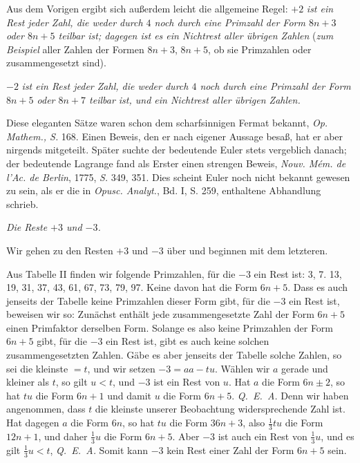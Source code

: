 Aus dem Vorigen ergibt sich außerdem leicht die allgemeine Regel: $+2$ \emph{ist ein Rest jeder Zahl, die weder durch $4$ noch durch eine Primzahl der Form $8n+3$ oder $8n+5$ teilbar ist; dagegen ist es ein Nichtrest aller übrigen Zahlen} (\emph{zum Beispiel} aller Zahlen der Formen $8n+3$, $8n+5$, ob sie Primzahlen oder zusammengesetzt sind).

$-2$ \emph{ist ein Rest jeder Zahl, die weder durch $4$ noch durch eine Primzahl der Form $8n+5$ oder $8n+7$ teilbar ist, und ein Nichtrest aller übrigen Zahlen.}

Diese eleganten Sätze waren schon dem scharfsinnigen Fermat bekannt, \emph{Op. Mathem., S.} 168. Einen Beweis, den er nach eigener Aussage besaß, hat er aber nirgends mitgeteilt. Später suchte der bedeutende Euler stets vergeblich danach; der bedeutende Lagrange fand als Erster einen strengen Beweis, \emph{Nouv. M\'em. de l'Ac. de Berlin}, 1775, \emph{S.} 349, 351. Dies scheint Euler noch nicht bekannt gewesen zu sein, als er die in \emph{Opusc. Analyt.}, Bd. I, S. 259, enthaltene Abhandlung schrieb.

\begin{center}\emph{Die Reste $+3$ und $-3$.}\end{center}

Wir gehen zu den Resten $+3$ und $-3$ über und beginnen mit dem letzteren.

Aus Tabelle II finden wir folgende Primzahlen, für die $-3$ ein Rest ist: 3, 7. 13, 19, 31, 37, 43, 61, 67, 73, 79, 97. Keine davon hat die Form $6n+5$. Dass es auch jenseits der Tabelle keine Primzahlen dieser Form gibt, für die $-3$ ein Rest ist, beweisen wir so: Zunächst enthält jede zusammengesetzte Zahl der Form $6n+5$ einen Primfaktor derselben Form. Solange es also keine Primzahlen der Form $6n+5$ gibt, für die $-3$ ein Rest ist, gibt es auch keine solchen zusammengesetzten Zahlen. Gäbe es aber jenseits der Tabelle solche Zahlen, so sei die kleinste $=t$, und wir setzen $-3=aa-tu$. Wählen wir $a$ gerade und kleiner als $t$, so gilt $u<t$, und $-3$ ist ein Rest von $u$. Hat $a$ die Form $6n\pm2$, so hat $tu$ die Form $6n+1$ und damit $u$ die Form $6n+5$. \mbox{\emph{Q. E. A.}} Denn wir haben angenommen, dass $t$ die kleinste unserer Beobachtung widersprechende Zahl ist. Hat dagegen $a$ die Form $6n$, so hat $tu$ die Form $36n+3$, also $\frac{1}{3}tu$ die Form $12n+1$, und daher $\frac{1}{3}u$ die Form $6n+5$. Aber $-3$ ist auch ein Rest von $\frac{1}{3}u$, und es gilt $\frac{1}{3}u<t$, \mbox{\emph{Q. E. A.}} Somit kann $-3$ kein Rest einer Zahl der Form $6n+5$ sein.

